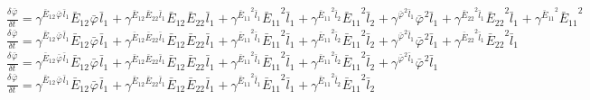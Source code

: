$\frac{{\delta}^{} {\bar{\varphi}}_{}}{{\delta} {{{t}}_{}}^{}} = {\gamma}^{{{{\bar{E}}_{12}}^{}{{\bar{\varphi}}_{}}^{}{{\bar{l}}_{1}}^{}}}{{{\bar{E}}_{12}}^{}{{\bar{\varphi}}_{}}^{}{{\bar{l}}_{1}}^{}} + {\gamma}^{{{{\bar{E}}_{12}}^{}{{\bar{E}}_{22}}^{}{{\bar{l}}_{1}}^{}}}{{{\bar{E}}_{12}}^{}{{\bar{E}}_{22}}^{}{{\bar{l}}_{1}}^{}} + {\gamma}^{{{{\bar{E}}_{11}}^{2}{{\bar{l}}_{1}}^{}}}{{{\bar{E}}_{11}}^{2}{{\bar{l}}_{1}}^{}} + {\gamma}^{{{{\bar{E}}_{11}}^{2}{{\bar{l}}_{2}}^{}}}{{{\bar{E}}_{11}}^{2}{{\bar{l}}_{2}}^{}} + {\gamma}^{{{{\bar{\varphi}}_{}}^{2}{{\bar{l}}_{1}}^{}}}{{{\bar{\varphi}}_{}}^{2}{{\bar{l}}_{1}}^{}} + {\gamma}^{{{{\bar{E}}_{22}}^{2}{{\bar{l}}_{1}}^{}}}{{{\bar{E}}_{22}}^{2}{{\bar{l}}_{1}}^{}} + {\gamma}^{{{{\bar{E}}_{11}}^{2}}}{{{\bar{E}}_{11}}^{2}}$
$\frac{{\delta}^{} {\bar{\varphi}}_{}}{{\delta} {{{t}}_{}}^{}} = {\gamma}^{{{{\bar{E}}_{12}}^{}{{\bar{\varphi}}_{}}^{}{{\bar{l}}_{1}}^{}}}{{{\bar{E}}_{12}}^{}{{\bar{\varphi}}_{}}^{}{{\bar{l}}_{1}}^{}} + {\gamma}^{{{{\bar{E}}_{12}}^{}{{\bar{E}}_{22}}^{}{{\bar{l}}_{1}}^{}}}{{{\bar{E}}_{12}}^{}{{\bar{E}}_{22}}^{}{{\bar{l}}_{1}}^{}} + {\gamma}^{{{{\bar{E}}_{11}}^{2}{{\bar{l}}_{1}}^{}}}{{{\bar{E}}_{11}}^{2}{{\bar{l}}_{1}}^{}} + {\gamma}^{{{{\bar{E}}_{11}}^{2}{{\bar{l}}_{2}}^{}}}{{{\bar{E}}_{11}}^{2}{{\bar{l}}_{2}}^{}} + {\gamma}^{{{{\bar{\varphi}}_{}}^{2}{{\bar{l}}_{1}}^{}}}{{{\bar{\varphi}}_{}}^{2}{{\bar{l}}_{1}}^{}} + {\gamma}^{{{{\bar{E}}_{22}}^{2}{{\bar{l}}_{1}}^{}}}{{{\bar{E}}_{22}}^{2}{{\bar{l}}_{1}}^{}}$
$\frac{{\delta}^{} {\bar{\varphi}}_{}}{{\delta} {{{t}}_{}}^{}} = {\gamma}^{{{{\bar{E}}_{12}}^{}{{\bar{\varphi}}_{}}^{}{{\bar{l}}_{1}}^{}}}{{{\bar{E}}_{12}}^{}{{\bar{\varphi}}_{}}^{}{{\bar{l}}_{1}}^{}} + {\gamma}^{{{{\bar{E}}_{12}}^{}{{\bar{E}}_{22}}^{}{{\bar{l}}_{1}}^{}}}{{{\bar{E}}_{12}}^{}{{\bar{E}}_{22}}^{}{{\bar{l}}_{1}}^{}} + {\gamma}^{{{{\bar{E}}_{11}}^{2}{{\bar{l}}_{1}}^{}}}{{{\bar{E}}_{11}}^{2}{{\bar{l}}_{1}}^{}} + {\gamma}^{{{{\bar{E}}_{11}}^{2}{{\bar{l}}_{2}}^{}}}{{{\bar{E}}_{11}}^{2}{{\bar{l}}_{2}}^{}} + {\gamma}^{{{{\bar{\varphi}}_{}}^{2}{{\bar{l}}_{1}}^{}}}{{{\bar{\varphi}}_{}}^{2}{{\bar{l}}_{1}}^{}}$
$\frac{{\delta}^{} {\bar{\varphi}}_{}}{{\delta} {{{t}}_{}}^{}} = {\gamma}^{{{{\bar{E}}_{12}}^{}{{\bar{\varphi}}_{}}^{}{{\bar{l}}_{1}}^{}}}{{{\bar{E}}_{12}}^{}{{\bar{\varphi}}_{}}^{}{{\bar{l}}_{1}}^{}} + {\gamma}^{{{{\bar{E}}_{12}}^{}{{\bar{E}}_{22}}^{}{{\bar{l}}_{1}}^{}}}{{{\bar{E}}_{12}}^{}{{\bar{E}}_{22}}^{}{{\bar{l}}_{1}}^{}} + {\gamma}^{{{{\bar{E}}_{11}}^{2}{{\bar{l}}_{1}}^{}}}{{{\bar{E}}_{11}}^{2}{{\bar{l}}_{1}}^{}} + {\gamma}^{{{{\bar{E}}_{11}}^{2}{{\bar{l}}_{2}}^{}}}{{{\bar{E}}_{11}}^{2}{{\bar{l}}_{2}}^{}}$
